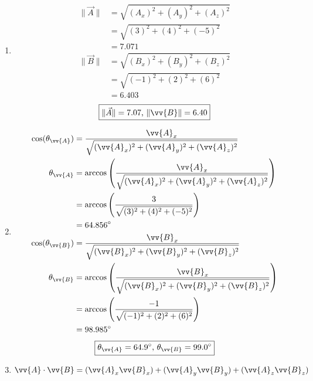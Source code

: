 \documentclass{article}
\begin{document}
\begin{enumerate}[label=\alph*)]
    \item
        \begin{align*}
            \|\vec{A}\| & = \sqrt{(A_x)^2 + (A_y)^2 + (A_z)^2} \\
                      & = \sqrt{(3)^2 + (4)^2 + (-5)^2} \\
                      & = 7.071 \\
            \|\vec{B}\| & = \sqrt{(B_x)^2 + (B_y)^2 + (B_z)^2} \\
                      & = \sqrt{(-1)^2 + (2)^2 + (6)^2} \\
                      & = 6.403
        \end{align*}
        \begin{equation*}
            \boxed{
                \|\vec{A}\| = 7.07 \text{, } \|\vv{B}\| = 6.40
            }
        \end{equation*}
    \item
        \begin{align*}
            \cos(\theta_{\vv{A}}) & = \frac{\vv{A}_x}{\sqrt{(\vv{A}_x)^2 + (\vv{A}_y)^2 + (\vv{A}_z)^2}} \\
            \theta_{\vv{A}} & = \arccos\left(\frac{\vv{A}_x}{\sqrt{(\vv{A}_x)^2 + (\vv{A}_y)^2 + (\vv{A}_z)^2}}\right) \\
                   & = \arccos\left(\frac{3}{\sqrt{(3)^2 + (4)^2 + (-5)^2}}\right) \\
                   & = 64.856\degree \\
            \cos(\theta_{\vv{B}}) & = \frac{\vv{B}_x}{\sqrt{(\vv{B}_x)^2 + (\vv{B}_y)^2 + (\vv{B}_z)^2}} \\
            \theta_{\vv{B}} & = \arccos\left(\frac{\vv{B}_x}{\sqrt{(\vv{B}_x)^2 + (\vv{B}_y)^2 + (\vv{B}_z)^2}}\right) \\
                            & = \arccos\left(\frac{-1}{\sqrt{(-1)^2 + (2)^2 + (6)^2}}\right) \\
                            & = 98.985\degree
        \end{align*}
        \begin{equation*}
            \boxed{
                \theta_{\vv{A}} = 64.9\degree \text{, } \theta_{\vv{B}} = 99.0\degree
            }
        \end{equation*}
    \item
        \begin{align*}
            \vv{A} \cdot \vv{B} & = (\vv{A}_x\vv{B}_x) + (\vv{A}_y\vv{B}_y) + (\vv{A}_z\vv{B}_z) \\

\end{align*}
\end{enumerate}
\end{document}
